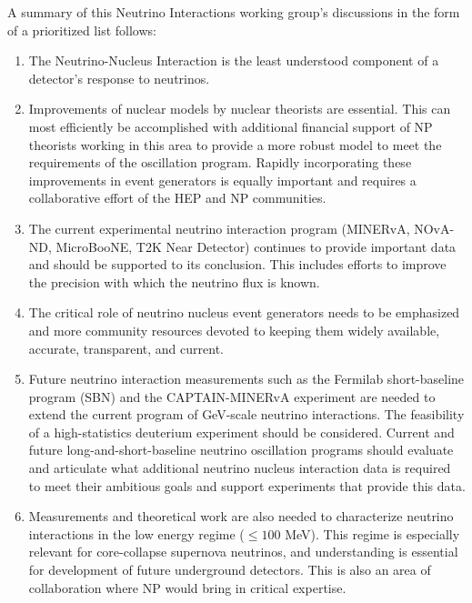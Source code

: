 A summary of this Neutrino Interactions working group's discussions in
the form of a prioritized list follows:
\begin{enumerate}
\item The Neutrino-Nucleus Interaction is the least understood
  component of a detector’s response to neutrinos.

\item Improvements of nuclear models by nuclear theorists are
  essential. This can most efficiently be accomplished with additional
  financial support of NP theorists working in this area to provide a
  more robust model to meet the requirements of the oscillation
  program.  Rapidly incorporating these improvements in event
  generators is equally important and requires a collaborative effort
  of the HEP and NP communities.

\item The current experimental neutrino interaction program (MINERvA,
  NOvA-ND, MicroBooNE, T2K Near Detector) continues to provide
  important data and should be supported to its conclusion.  This
  includes efforts to improve the precision with which the neutrino
  flux is known.

\item The critical role of neutrino nucleus event generators needs to
  be emphasized and more community resources devoted to keeping them
  widely available, accurate, transparent, and current.

\item Future neutrino interaction measurements such as the Fermilab
  short-baseline program (SBN) and the CAPTAIN-MINERvA experiment are
  needed to extend the current program of GeV-scale neutrino
  interactions.  The feasibility of a high-statistics deuterium
  experiment should be considered.  Current and future
  long-and-short-baseline neutrino oscillation programs should
  evaluate and articulate what additional neutrino nucleus interaction
  data is required to meet their ambitious goals and support
  experiments that provide this data.

\item Measurements and theoretical work are also needed to
  characterize neutrino interactions in the low energy regime ($ \leq
  100 $ MeV). This regime is especially relevant for core-collapse
  supernova neutrinos, and understanding is essential for development
  of future underground detectors.  This is also an area of
  collaboration where NP would bring in critical expertise.

\end{enumerate}
